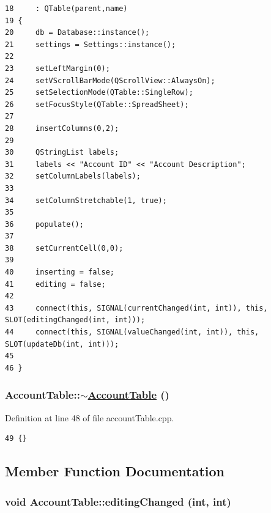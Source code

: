 \footnotesize\begin{verbatim}18     : QTable(parent,name)  
19 {
20     db = Database::instance();
21     settings = Settings::instance();
22 
23     setLeftMargin(0);
24     setVScrollBarMode(QScrollView::AlwaysOn);
25     setSelectionMode(QTable::SingleRow);
26     setFocusStyle(QTable::SpreadSheet);
27     
28     insertColumns(0,2);
29     
30     QStringList labels;
31     labels << "Account ID" << "Account Description";
32     setColumnLabels(labels);
33     
34     setColumnStretchable(1, true);
35     
36     populate();
37 
38     setCurrentCell(0,0);
39     
40     inserting = false;
41     editing = false;
42     
43     connect(this, SIGNAL(currentChanged(int, int)), this, SLOT(editingChanged(int, int)));
44     connect(this, SIGNAL(valueChanged(int, int)), this, SLOT(updateDb(int, int)));
45     
46 }
\end{verbatim}\normalsize 


\hypertarget{classAccountTable_a1}{
\subsubsection[$\sim$AccountTable]{\setlength{\rightskip}{0pt plus 5cm}Account\-Table::$\sim$\hyperlink{classAccountTable}{Account\-Table} ()}}
\label{classAccountTable_a1}


Definition at line 48 of file account\-Table.cpp.

\footnotesize\begin{verbatim}49 {}
\end{verbatim}\normalsize 




\subsection{Member Function Documentation}
\hypertarget{classAccountTable_k1}{
\subsubsection[editingChanged]{\setlength{\rightskip}{0pt plus 5cm}void Account\-Table::editing\-Changed (int, int)}}
\label{classAccountTable_k1}


